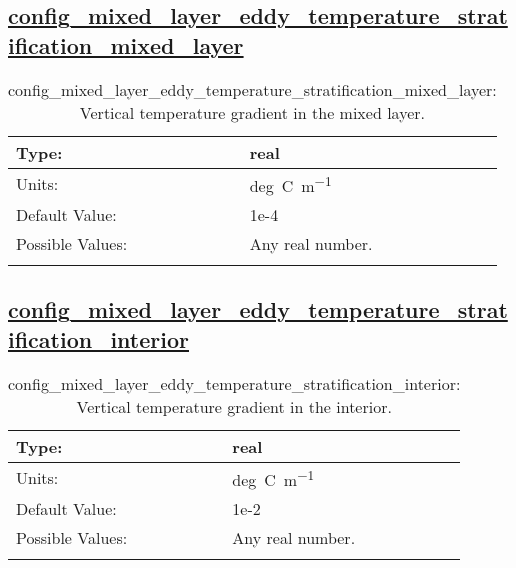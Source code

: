 \subsection[config\_mixed\_layer\_eddy\_temperature\_stratification\_mixed\_layer]{\hyperref[sec:nm_tab_mixed_layer_eddy]{config\_mixed\_layer\_eddy\_temperature\_stratification\_mixed\_layer}}
\label{subsec:nm_sec_config_mixed_layer_eddy_temperature_stratification_mixed_layer}
\begin{center}
\begin{longtable}{| p{2.0in} || p{4.0in} |}
    \hline
    Type: & real \\
    \hline
    Units: & \si{deg.C.m^{-1}} \\
    \hline
    Default Value: & 1e-4 \\
    \hline
    Possible Values: & Any real number. \\
    \hline
    \caption{config\_mixed\_layer\_eddy\_temperature\_stratification\_mixed\_layer: Vertical temperature gradient in the mixed layer.}
\end{longtable}
\end{center}
\subsection[config\_mixed\_layer\_eddy\_temperature\_stratification\_interior]{\hyperref[sec:nm_tab_mixed_layer_eddy]{config\_mixed\_layer\_eddy\_temperature\_stratification\_interior}}
\label{subsec:nm_sec_config_mixed_layer_eddy_temperature_stratification_interior}
\begin{center}
\begin{longtable}{| p{2.0in} || p{4.0in} |}
    \hline
    Type: & real \\
    \hline
    Units: & \si{deg.C.m^{-1}} \\
    \hline
    Default Value: & 1e-2 \\
    \hline
    Possible Values: & Any real number. \\
    \hline
    \caption{config\_mixed\_layer\_eddy\_temperature\_stratification\_interior: Vertical temperature gradient in the interior.}
\end{longtable}
\end{center}

